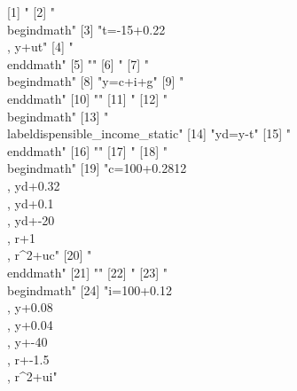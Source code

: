 [1] "%
 [2] "\\begin{dmath}"                                                              
 [3] "{t}=-15+0.22\\, {y}+{ut}"                                                    
 [4] "\\end{dmath}"                                                                
 [5] ""                                                                            
 [6] "%
 [7] "\\begin{dmath}"                                                              
 [8] "{y}={c}+{i}+{g}"                                                             
 [9] "\\end{dmath}"                                                                
[10] ""                                                                            
[11] "%
[12] "\\begin{dmath}"                                                              
[13] "\\label{dispensible_income_static}"                                          
[14] "{yd}={y}-{t}"                                                                
[15] "\\end{dmath}"                                                                
[16] ""                                                                            
[17] "%
[18] "\\begin{dmath}"                                                              
[19] "{c}=100+0.2812\\, {yd}+0.32\\, {yd}+0.1\\, {yd}+-20\\, {r}+1\\, {r}^{2}+{uc}"
[20] "\\end{dmath}"                                                                
[21] ""                                                                            
[22] "%
[23] "\\begin{dmath}"                                                              
[24] "{i}=100+0.12\\, {y}+0.08\\, {y}+0.04\\, {y}+-40\\, {r}+-1.5\\, {r}^{2}+{ui}" 

